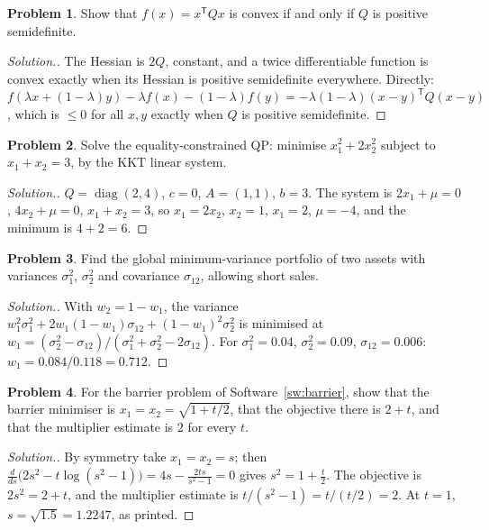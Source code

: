 \documentclass[11pt,a4paper]{article}
\numberwithin{equation}{section}
\theoremstyle{definition}
\newtheorem{problemx}{Problem}[subsection]
\newenvironment{problem}{\begin{problemx}}{\end{problemx}}
\newenvironment{solution}
  {\renewcommand{\qedsymbol}{}\begin{proof}[\textit{Solution}.]}
  {\end{proof}}
\begin{document}
\begin{problem}
Show that $f(x) = x^{\mathsf T}Qx$ is convex if and only if $Q$ is positive semidefinite.
\end{problem}

\begin{solution}
The Hessian is $2Q$, constant, and a twice differentiable function is convex exactly when its Hessian is positive semidefinite everywhere. Directly: $f(\lambda x + (1 - \lambda)y) - \lambda f(x) - (1 - \lambda)f(y) = -\lambda(1 - \lambda)(x - y)^{\mathsf T}Q(x - y)$, which is $\leq 0$ for all $x, y$ exactly when
$Q$ is positive semidefinite.
\end{solution}

\begin{problem}
Solve the equality-constrained QP: minimise $x_1^2 + 2x_2^2$ subject to $x_1 + x_2 = 3$, by the KKT linear system.
\end{problem}

\begin{solution}
$Q = \operatorname{diag}(2, 4)$, $c = 0$, $A = (1, 1)$, $b = 3$. The system is $2x_1 + \mu = 0$, $4x_2 + \mu = 0$, $x_1 + x_2 = 3$, so $x_1 = 2x_2$, $x_2 = 1$, $x_1 = 2$, $\mu = -4$, and the minimum is $4 + 2 = 6$.
\end{solution}

\begin{problem}
Find the global minimum-variance portfolio of two assets with variances $\sigma_1^2$, $\sigma_2^2$ and covariance $\sigma_{12}$, allowing short sales.
\end{problem}

\begin{solution}
With $w_2 = 1 - w_1$, the variance $w_1^2\sigma_1^2 + 2w_1(1 - w_1)\sigma_{12} + (1 - w_1)^2\sigma_2^2$ is minimised at $w_1 = (\sigma_2^2 - \sigma_{12})/(\sigma_1^2 + \sigma_2^2 - 2\sigma_{12})$. For $\sigma_1^2 = 0.04$, $\sigma_2^2 = 0.09$, $\sigma_{12} = 0.006$: $w_1 = 0.084/0.118 = 0.712$.
\end{solution}

\begin{problem}
For the barrier problem of Software~\ref{sw:barrier}, show that the barrier minimiser is $x_1 = x_2 = \sqrt{1 + t/2}$, that the objective there is $2 + t$, and that the multiplier estimate is $2$ for every $t$.
\end{problem}

\begin{solution}
By symmetry take $x_1 = x_2 = s$; then $\frac{d}{ds}\bigl(2s^2 - t\log(s^2 - 1)\bigr) = 4s - \frac{2ts}{s^2 - 1} = 0$ gives $s^2 = 1 + \frac t2$. The objective is $2s^2 = 2 + t$, and the multiplier estimate is $t/(s^2 - 1) = t/(t/2) = 2$. At $t = 1$, $s = \sqrt{1.5} = 1.2247$, as printed.
\end{solution}
\end{document}
